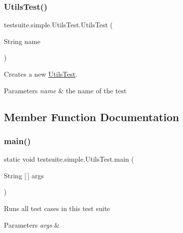 \subsubsection{\texorpdfstring{Utils\+Test()}{UtilsTest()}}
{\footnotesize\ttfamily testsuite.\+simple.\+Utils\+Test.\+Utils\+Test (\begin{DoxyParamCaption}\item[{String}]{name }\end{DoxyParamCaption})}

Creates a new \mbox{\hyperlink{classtestsuite_1_1simple_1_1_utils_test}{Utils\+Test}}.


\begin{DoxyParams}{Parameters}
{\em name} & the name of the test \\
\hline
\end{DoxyParams}


\subsection{Member Function Documentation}
\mbox{\label{classtestsuite_1_1simple_1_1_utils_test_a131ce08ba1049981947b3982e95d9e34}} 
\subsubsection{\texorpdfstring{main()}{main()}}
{\footnotesize\ttfamily static void testsuite.\+simple.\+Utils\+Test.\+main (\begin{DoxyParamCaption}\item[{String \mbox{[}$\,$\mbox{]}}]{args }\end{DoxyParamCaption})\hspace{0.3cm}{\ttfamily [static]}}

Runs all test cases in this test suite


\begin{DoxyParams}{Parameters}
{\em args} & \\
\hline
\end{DoxyParams}
\mbox{\label{classtestsuite_1_1simple_1_1_utils_test_a173e24f02866b3c9a9356d28077db9b3}} 

